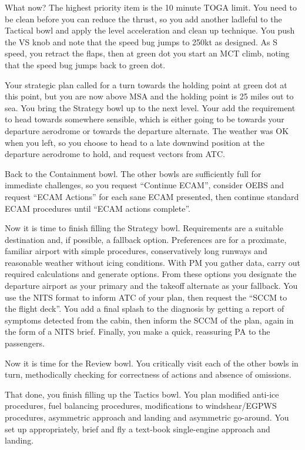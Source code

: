 \documentclass[a5paper,11pt,titlepage]{article}
\begin{document}
What now? The highest priority item is the 10 minute TOGA limit. You
need to be clean before you can reduce the thrust, so you add another
ladleful to the Tactical bowl and apply the level acceleration and
clean up technique. You push the VS knob and note that the speed bug
jumps to 250kt as designed. As S speed, you retract the flaps, then at
green dot you start an MCT climb, noting that the speed bug jumps back
to green dot.

Your strategic plan called for a turn towards the holding point at green
dot at this point, but you are now above MSA and the holding point is 25
miles out to sea. You bring the Strategy bowl up to the next level. Your
add the requirement to head towards somewhere sensible, which is either
going to be towards your departure aerodrome or towards the departure
alternate. The weather was OK when you left, so you choose to head to a
late downwind position at the departure aerodrome to hold, and request
vectors from ATC.

Back to the Containment bowl. The other bowls are sufficiently full for
immediate challenges, so you request ``Continue ECAM'', consider OEBS
and request ``ECAM Actions'' for each sane ECAM presented, then continue
standard ECAM procedures until ``ECAM actions complete''.

Now it is time to finish filling the Strategy bowl. Requirements are a
suitable destination and, if possible, a fallback option. Preferences
are for a proximate, familiar airport with simple procedures,
conservatively long runways and reasonable weather without icing
conditions. With PM you gather data, carry out required calculations and
generate options. From these options you designate the departure airport
as your primary and the takeoff alternate as your fallback. You use the
NITS format to inform ATC of your plan, then request the ``SCCM to the
flight deck''. You add a final splash to the diagnosis by getting a
report of symptoms detected from the cabin, then inform the SCCM of the
plan, again in the form of a NITS brief. Finally, you make a quick,
reassuring PA to the passengers.

Now it is time for the Review bowl. You critically visit each of the
other bowls in turn, methodically checking for correctness of actions
and absence of omissions.

That done, you finish filling up the Tactics bowl. You plan modified
anti-ice procedures, fuel balancing procedures, modifications to
windshear/EGPWS procedures, asymmetric approach and landing and
asymmetric go-around. You set up appropriately, brief and fly a text-book
single-engine approach and landing.
\end{document}
